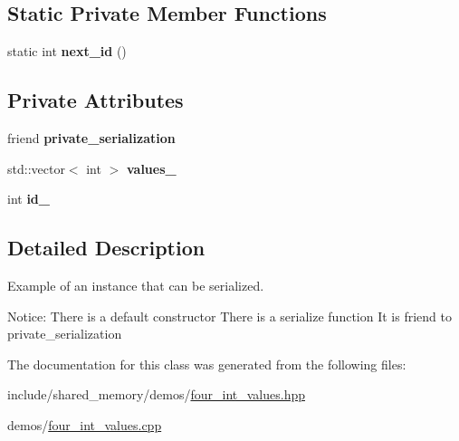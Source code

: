\subsection*{Static Private Member Functions}
\begin{DoxyCompactItemize}
\item 
\mbox{\label{classshared__memory_1_1Four__int__values_a2b34bc8100ec157982d0c6d7a1df14de}} 
static int {\bfseries next\+\_\+id} ()
\end{DoxyCompactItemize}
\subsection*{Private Attributes}
\begin{DoxyCompactItemize}
\item 
\mbox{\label{classshared__memory_1_1Four__int__values_a692d60e4a7802cad45c215c65632e888}} 
friend {\bfseries private\+\_\+serialization}
\item 
\mbox{\label{classshared__memory_1_1Four__int__values_a253eba8afb24a1679013be704b224ea5}} 
std\+::vector$<$ int $>$ {\bfseries values\+\_\+}
\item 
\mbox{\label{classshared__memory_1_1Four__int__values_a2272823a3c672123c022851611640dd1}} 
int {\bfseries id\+\_\+}
\end{DoxyCompactItemize}


\subsection{Detailed Description}
Example of an instance that can be serialized. 

Notice\+: There is a default constructor There is a serialize function It is friend to private\+\_\+serialization 

The documentation for this class was generated from the following files\+:\begin{DoxyCompactItemize}
\item 
include/shared\+\_\+memory/demos/\hyperlink{four__int__values_8hpp}{four\+\_\+int\+\_\+values.\+hpp}\item 
demos/\hyperlink{four__int__values_8cpp}{four\+\_\+int\+\_\+values.\+cpp}\end{DoxyCompactItemize}

